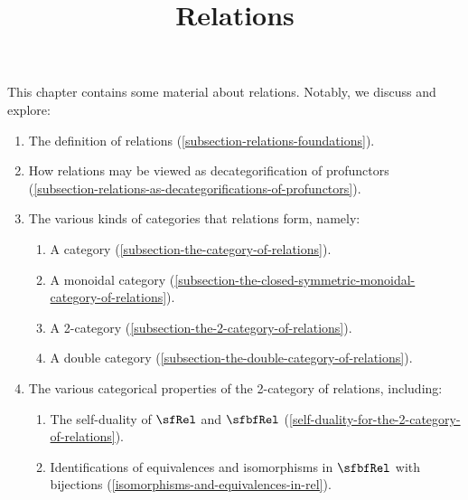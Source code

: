 

%



\title{Relations}

\maketitle

\label{section-phantom}

This chapter contains some material about relations. Notably, we discuss and explore:
\begin{enumerate}
    \item\label{relations-introduction-item-1}The definition of relations (\cref{subsection-relations-foundations}).
    \item\label{relations-introduction-item-2}How relations may be viewed as decategorification of profunctors (\cref{subsection-relations-as-decategorifications-of-profunctors}).
    \item\label{relations-introduction-item-3}The various kinds of categories that relations form, namely:
        \begin{enumerate}
            \item\label{relations-introduction-item-3a}A category (\cref{subsection-the-category-of-relations}).
            \item\label{relations-introduction-item-3b}A monoidal category (\cref{subsection-the-closed-symmetric-monoidal-category-of-relations}).
            \item\label{relations-introduction-item-3c}A 2-category (\cref{subsection-the-2-category-of-relations}).
            \item\label{relations-introduction-item-3d}A double category (\cref{subsection-the-double-category-of-relations}).
        \end{enumerate}
    \item\label{relations-introduction-item-4}The various categorical properties of the 2-category of relations, including:
        \begin{enumerate}
            \item\label{relations-introduction-item-4a}The self-duality of $\sfRel$ and $\sfbfRel$ (\cref{self-duality-for-the-2-category-of-relations}).
            \item\label{relations-introduction-item-4b}Identifications of equivalences and isomorphisms in $\sfbfRel$ with bijections (\cref{isomorphisms-and-equivalences-in-rel}).

\end{enumerate}
\end{enumerate}
